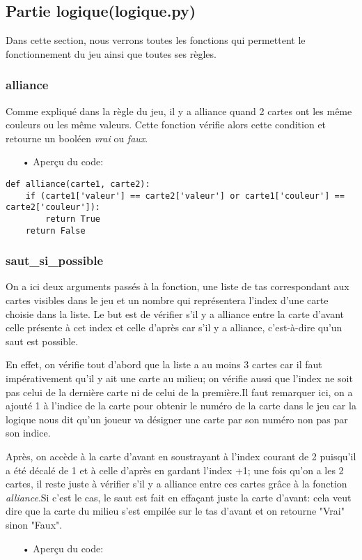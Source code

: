 \subsection{Partie logique(logique.py)}
	Dans cette section, nous verrons toutes les fonctions qui permettent le fonctionnement du jeu ainsi que toutes ses règles.
	\subsubsection{alliance}
	Comme expliqué dans la règle du jeu, il y a alliance quand 2 cartes ont les même couleurs ou les même valeurs. Cette fonction vérifie alors cette condition et retourne un booléen \emph{vrai} ou \emph{faux}.
	\\
	\begin{itemize}
	\color{blue}\item[•]Aperçu du code:
	\end{itemize}
	
	\lstset{language=Python}
	\lstset{frame=lines}
	\lstset{basicstyle=\footnotesize}
	\begin{lstlisting}
def alliance(carte1, carte2):
    if (carte1['valeur'] == carte2['valeur'] or carte1['couleur'] == carte2['couleur']):
        return True
    return False
	\end{lstlisting}
	
	\subsubsection{saut\_si\_possible}
	On a ici deux arguments passés à la fonction, une liste de tas correspondant aux cartes visibles dans le jeu et un nombre qui représentera l'index d'une carte choisie dans la liste. Le but est de vérifier s'il y a alliance entre la carte d'avant celle présente à cet index et celle d'après car s'il y a alliance, c'est-à-dire qu'un saut est possible.
	\par En effet, on vérifie tout d'abord que la liste a au moins 3 cartes car il faut impérativement qu'il y ait une carte au milieu; on vérifie aussi que l'index ne soit pas celui de la dernière carte ni de celui de la première.Il faut remarquer ici, on a ajouté 1 à l'indice de la carte pour obtenir le numéro de la carte dans le jeu car la logique nous dit qu'un joueur va désigner une carte par son numéro non pas par son indice.
	\par Après, on accède à la carte d'avant en soustrayant à l'index courant de 2 puisqu'il a été décalé de 1 et à celle d'après en gardant l'index +1; une fois qu'on a les 2 cartes, il reste juste à vérifier s'il y a alliance entre ces cartes grâce à la fonction \emph{alliance}.Si c'est le cas, le saut est fait en effaçant juste la carte d'avant: cela veut dire que la carte du milieu s'est empilée sur le tas d'avant et on retourne "Vrai" sinon "Faux".
	\\
	\begin{itemize}
	\color{blue}\item[•]Aperçu du code:
	\end{itemize}
	
